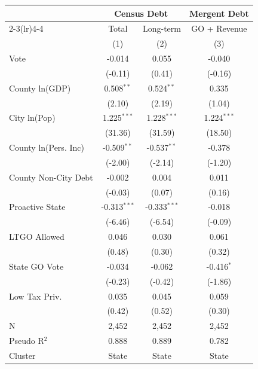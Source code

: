 \begingroup
\centering
\begin{tabular*}{\textwidth}{@{\extracolsep{\fill}}lccc}
   \toprule
                        & \multicolumn{2}{c}{Census Debt} & \multicolumn{1}{c}{Mergent Debt}\\  
   \cmidrule(lr){2-3}\cmidrule(lr){4-4}
                        & Total             & Long-term             & GO + Revenue \\   
                        & (1)               & (2)                   & (3)\\  
   \midrule 
   Vote                 & -0.014            & 0.055                 & -0.040\\   
                        & (-0.11)          & (0.41)               & (-0.16)\\   
   County ln(GDP)       & 0.508$^{**}$      & 0.524$^{**}$          & 0.335\\   
                        & (2.10)           & (2.19)               & (1.04)\\   
   City ln(Pop)         & 1.225$^{***}$     & 1.228$^{***}$         & 1.224$^{***}$\\   
                        & (31.36)          & (31.59)              & (18.50)\\   
   County ln(Pers. Inc) & -0.509$^{**}$     & -0.537$^{**}$         & -0.378\\   
                        & (-2.00)          & (-2.14)              & (-1.20)\\   
   County Non-City Debt & -0.002            & 0.004                 & 0.011\\   
                        & (-0.03)          & (0.07)               & (0.16)\\   
   Proactive State      & -0.313$^{***}$    & -0.333$^{***}$        & -0.018\\   
                        & (-6.46)          & (-6.54)              & (-0.09)\\   
   LTGO Allowed         & 0.046             & 0.030                 & 0.061\\   
                        & (0.48)           & (0.30)               & (0.32)\\   
   State GO Vote        & -0.034            & -0.062                & -0.416$^{*}$\\   
                        & (-0.23)          & (-0.42)              & (-1.86)\\   
   Low Tax Priv.        & 0.035             & 0.045                 & 0.059\\   
                        & (0.42)           & (0.52)               & (0.30)\\   
   \hline
   N         & 2,452             & 2,452                 & 2,452\\  
   Pseudo R$^2$         & 0.888             & 0.889                 & 0.782\\  
   Cluster              & State & State & State\\  
   \bottomrule
\end{tabular*}
\par\endgroup
